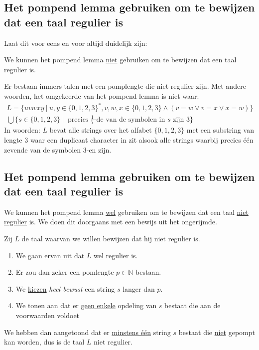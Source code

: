 \documentclass[main.tex]{subfiles}
\begin{document}
\subsection{Het pompend lemma gebruiken om te bewijzen dat een taal regulier is}
Laat dit voor eens en voor altijd duidelijk zijn:
\begin{center}
  We kunnen het pompend lemma \underline{niet} gebruiken om te bewijzen dat een taal regulier is.
\end{center}
Er bestaan immers talen met een pomplengte die niet regulier zijn.
Met andere woorden, het omgekeerde van het pompend lemma is niet waar:
\[ 
\begin{array}{c}
  L = \{ uvwxy\ |\ u,y \in \{0,1,2,3\}^{*}, v,w,x\in \{0,1,2,3\} \wedge (v=w \vee v=x \vee x=w)\}\\
  \bigcup \{ s \in \{0,1,2,3\}\ |\ \text{ precies } \frac{1}{7} \text{-de van de symbolen in } s \text{ zijn } 3 \}  
\end{array}
\]
In woorden: $L$ bevat alle strings over het alfabet $\{0,1,2,3\}$ met een substring van lengte $3$ waar een duplicaat character in zit alsook alle strings waarbij precies \'e\'en zevende van de symbolen $3$-en zijn.

\subsection{Het pompend lemma gebruiken om te bewijzen dat een taal regulier is}
We kunnen het pompend lemma \underline{wel} gebruiken om te bewijzen dat een taal \underline{niet regulier} is.
We doen dit doorgaans met een bewijs uit het ongerijmde.

Zij $L$ de taal waarvan we willen bewijzen dat hij niet regulier is.
\begin{enumerate}
\item We gaan \underline{ervan uit} dat $L$ \underline{wel} regulier is.
\item Er zou dan zeker een pomlengte $p\in \mathbb{N}$ bestaan.
\item We \underline{kiezen} \emph{heel bewust} een string $s$ langer dan $p$.
\item We tonen aan dat er \underline{geen enkele} opdeling van $s$ bestaat die aan de voorwaarden voldoet
\end{enumerate}
We hebben dan aangetoond dat er \underline{minstens \'e\'en} string $s$ bestaat die \underline{niet} gepompt kan worden, dus is de taal $L$ niet regulier.
\end{document}
